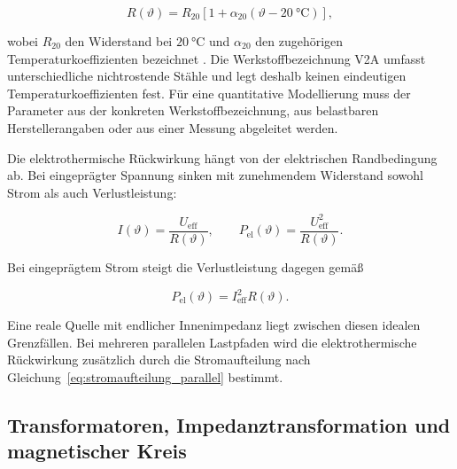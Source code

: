 \begin{equation}
  R(\vartheta)
  =
  R_{20}
  \left[
    1+\alpha_{20}
    \left(
      \vartheta-\SI{20}{\degreeCelsius}
    \right)
  \right],
  \label{eq:widerstand_temperatur}
\end{equation}

wobei \(R_{20}\) den Widerstand bei \(\SI{20}{\degreeCelsius}\) und
\(\alpha_{20}\) den zugehörigen Temperaturkoeffizienten bezeichnet
\autocite[Abschn.~2.1.4]{plassmann_formeln}. Die Werkstoffbezeichnung V2A
umfasst unterschiedliche nichtrostende Stähle und legt deshalb keinen
eindeutigen Temperaturkoeffizienten fest. Für eine quantitative Modellierung
muss der Parameter aus der konkreten Werkstoffbezeichnung, aus belastbaren
Herstellerangaben oder aus einer Messung abgeleitet werden.

Die elektrothermische Rückwirkung hängt von der elektrischen Randbedingung ab.
Bei eingeprägter Spannung sinken mit zunehmendem Widerstand sowohl Strom als
auch Verlustleistung:

\begin{equation}
  I(\vartheta)
  =
  \frac{U_{\mathrm{eff}}}{R(\vartheta)},
  \qquad
  P_{\mathrm{el}}(\vartheta)
  =
  \frac{U_{\mathrm{eff}}^2}{R(\vartheta)}.
  \label{eq:konstante_spannung}
\end{equation}

Bei eingeprägtem Strom steigt die Verlustleistung dagegen gemäß

\begin{equation}
  P_{\mathrm{el}}(\vartheta)
  =
  I_{\mathrm{eff}}^2R(\vartheta).
  \label{eq:konstanter_strom}
\end{equation}

Eine reale Quelle mit endlicher Innenimpedanz liegt zwischen diesen idealen
Grenzfällen. Bei mehreren parallelen Lastpfaden wird die elektrothermische
Rückwirkung zusätzlich durch die Stromaufteilung nach
Gleichung~\ref{eq:stromaufteilung_parallel} bestimmt.


\subsection{Transformatoren, Impedanztransformation und magnetischer Kreis}
\label{sec:transformator_impedanztransformation}

